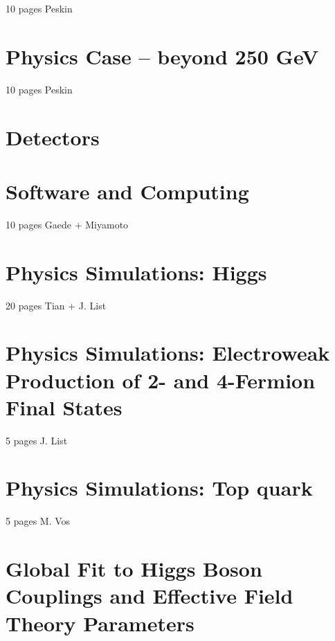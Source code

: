 \documentclass[%
 reprint,
nofootinbib,
 amsmath,amssymb,
 aps,
]{revtex4-1}
\begin{document}
10 pages Peskin
 


\section{\label{sec:highenergy}Physics Case -- beyond 250 GeV }

10 pages Peskin
 


 
\section{\label{sec:detectors}Detectors }


\section{\label{sec:software}Software and Computing}

   10 pages Gaede + Miyamoto
   
   

\section{\label{sec:higgs}Physics Simulations: Higgs
}


  20 pages Tian + J. List
  
 

\section{\label{sec:ew}Physics Simulations: Electroweak Production of 2- and 4-Fermion Final States }


  5 pages J. List
  
  

\section{\label{sec:top}Physics Simulations: Top quark}

  5 pages M. Vos
  
  

\section{\label{sec:global}Global Fit to Higgs Boson Couplings and Effective Field Theory Parameters}
\end{document}
